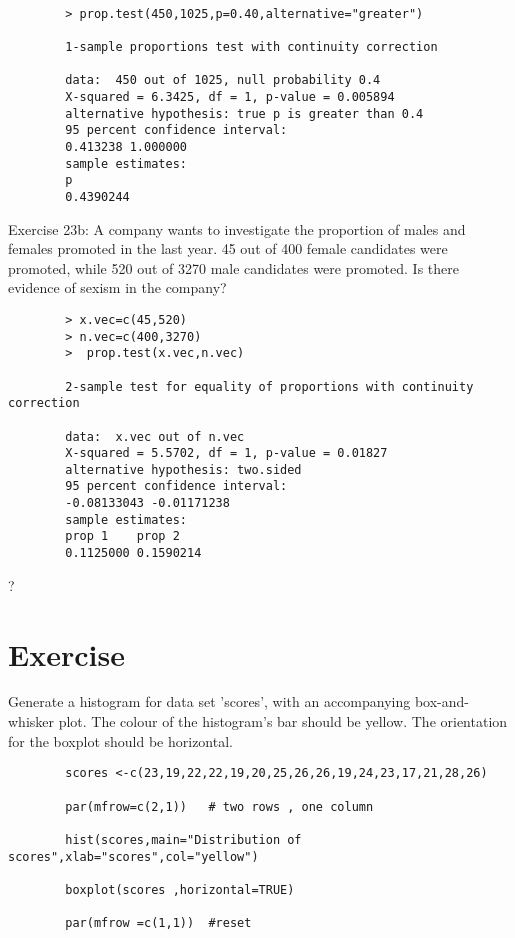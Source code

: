 \documentclass[a4paper,12pt]{article}
\begin{document}
\begin{itemize}
\begin{itemize}
		\begin{verbatim}
		
		> prop.test(450,1025,p=0.40,alternative="greater")
		
		1-sample proportions test with continuity correction
		
		data:  450 out of 1025, null probability 0.4
		X-squared = 6.3425, df = 1, p-value = 0.005894
		alternative hypothesis: true p is greater than 0.4
		95 percent confidence interval:
		0.413238 1.000000
		sample estimates:
		p
		0.4390244
		\end{verbatim}
		
		Exercise 23b:  A company wants to investigate the proportion of males and females promoted in the last year. 45 out of 400 female candidates were promoted, while 520 out of 3270 male candidates were promoted. Is there evidence of sexism in the company?
		\begin{verbatim}
		> x.vec=c(45,520)
		> n.vec=c(400,3270)
		>  prop.test(x.vec,n.vec)
		
		2-sample test for equality of proportions with continuity correction
		
		data:  x.vec out of n.vec
		X-squared = 5.5702, df = 1, p-value = 0.01827
		alternative hypothesis: two.sided
		95 percent confidence interval:
		-0.08133043 -0.01171238
		sample estimates:
		prop 1    prop 2
		0.1125000 0.1590214
		\end{verbatim}
		
		?
		\section{Exercise}
		
		Generate a histogram for data set 'scores', with an accompanying box-and-whisker plot.
		The colour of the histogram's bar should be yellow. The orientation for the boxplot should be horizontal.
		
		\begin{verbatim}
		scores <-c(23,19,22,22,19,20,25,26,26,19,24,23,17,21,28,26)
		
		par(mfrow=c(2,1)) 	# two rows , one column
		
		hist(scores,main="Distribution of scores",xlab="scores",col="yellow")
		
		boxplot(scores ,horizontal=TRUE)
		
		par(mfrow =c(1,1)) 	#reset
		\end{verbatim}
		

\end{itemize}
\end{itemize}
\end{document}

